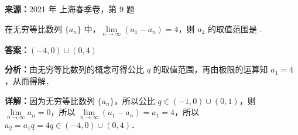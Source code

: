 \begin{question}[points=5]
\textbf{来源：}2021 年 上海春季卷，第 9 题\par
在无穷等比数列 $\{a_n\}$ 中，$\lim\limits_{n\to\infty}(a_1-a_n)=4$，则 $a_2$ 的取值范围是  .
\fillin[{$(-4,0)\cup(0,4)$}]
\begin{solution}
\textbf{答案：}$(-4,0)\cup(0,4)$

\textbf{分析：}由无穷等比数列的概念可得公比 $q$ 的取值范围，再由极限的运算知 $a_1=4$，从而得解．

\textbf{详解：}因为无穷等比数列 $\{a_n\}$，所以公比 $q\in(-1,0)\cup(0,1)$，则 $\lim\limits_{n\to\infty}a_n=0$，所以 $\lim\limits_{n\to\infty}(a_1-a_n)=a_1=4$，所以 $a_2=a_1q=4q\in(-4,0)\cup(0,4)$．
\end{solution}
\end{question}

